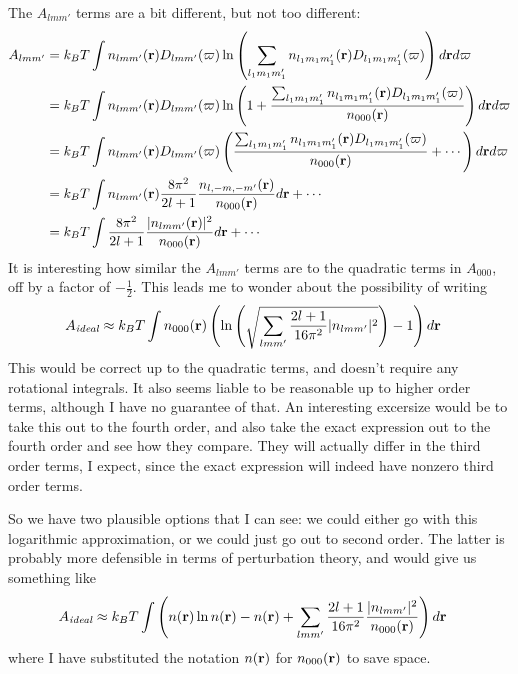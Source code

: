 \documentclass[letterpaper,twocolumn,amsmath,amssymb,pre]{revtex4-1}
\begin{document}
\begin{widetext}
The $A_{lmm'}$ terms are a bit different, but not too different:
\begin{align}
  A_{lmm'} &=
  k_BT \int n_{lmm'}(\mathbf{r}) D_{lmm'}(\mathbf{\varpi})
  \ln\left(\sum_{l_1m_1m'_1} n_{l_1m_1m'_1}(\mathbf{r})
  D_{l_1m_1m'_1}(\mathbf{\varpi})\right)
  d\mathbf{r} d\mathbf{\varpi}
  \\
  &=
  k_BT \int n_{lmm'}(\mathbf{r}) D_{lmm'}(\mathbf{\varpi})
  \ln\left(1 + \frac{\sum_{l_1m_1m'_1} n_{l_1m_1m'_1}(\mathbf{r})
  D_{l_1m_1m'_1}(\mathbf{\varpi})}{n_{000}(\mathbf{r})}\right)
  d\mathbf{r} d\mathbf{\varpi}
  \\
  &=
  k_BT \int n_{lmm'}(\mathbf{r}) D_{lmm'}(\mathbf{\varpi})
  \left(\frac{\sum_{l_1m_1m'_1} n_{l_1m_1m'_1}(\mathbf{r})
  D_{l_1m_1m'_1}(\mathbf{\varpi})}{n_{000}(\mathbf{r})}+\cdots\right)
  d\mathbf{r} d\mathbf{\varpi}
  \\
  &=
  k_BT \int n_{lmm'}(\mathbf{r}) \frac{8\pi^2}{2l+1} \frac{n_{l,-m,-m'}(\mathbf{r})}{n_{000}(\mathbf{r})}
  d\mathbf{r} + \cdots
  \\
  &=
  k_BT \int \frac{8\pi^2}{2l+1} \frac{|n_{lmm'}(\mathbf{r})|^2}{n_{000}(\mathbf{r})}
  d\mathbf{r} + \cdots
\end{align}
It is interesting how similar the $A_{lmm'}$ terms are to the
quadratic terms in $A_{000}$, off by a factor of $-\frac12$.  This
leads me to wonder about the possibility of writing
\begin{align}
  A_{\textit{ideal}} &\approx
  k_BT \int n_{000}(\mathbf{r})\left( \ln\left(
  \sqrt{\sum_{lmm'}\frac{2l+1}{16\pi^2}|n_{lmm'}|^2}
  \right) - 1\right)d\mathbf{r}
\end{align}
This would be correct up to the quadratic terms, and doesn't require
any rotational integrals.  It also seems liable to be reasonable up to
higher order terms, although I have no guarantee of that.  An
interesting excersize would be to take this out to the fourth order,
and also take the exact expression out to the fourth order and see how
they compare.  They will actually differ in the third order terms, I
expect, since the exact expression will indeed have nonzero third
order terms.

So we have two plausible options that I can see: we could either go
with this logarithmic approximation, or we could just go out to second
order.  The latter is probably more defensible in terms of
perturbation theory, and would give us something like
\begin{align}
  A_{\textit{ideal}} &\approx
  k_BT \int \left(n(\mathbf{r})\ln n(\mathbf{r}) - n(\mathbf{r}) +
  \sum_{lmm'}\frac{2l+1}{16\pi^2}\frac{|n_{lmm'}|^2}{n_{000}(\mathbf{r})}
  \right)d\mathbf{r}
\end{align}
where I have substituted the notation $n(\mathbf{r})$ for $n_{000}(\mathbf{r})$ to
save space.

\end{widetext}
\end{document}

